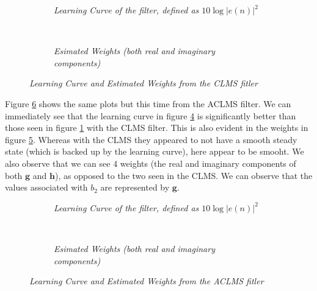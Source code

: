 \documentclass[./main.tex]{subfiles}
\begin{document}
\begin{figure}[h]
	\centering
	\begin{subfigure}[b]{0.49\textwidth}
		\resizebox{\textwidth}{!}{}
		\caption{\textit{Learning Curve of the filter, defined as $ 10 \log|e(n)|^2 $}}
		\label{fig:4_1_a_clms_err}
	\end{subfigure}
	~ %
	\begin{subfigure}[b]{0.49\textwidth}
	 \resizebox{\textwidth}{!}{}
		\caption{\textit{Esimated Weights (both real and imaginary components)}}
		\label{fig:4_1_a_clms_weights}
	\end{subfigure}
	\caption{\textit{Learning Curve and Estimated Weights from the CLMS fitler}}
\end{figure}

Figure \ref{fig:4_1_a_aclms} shows the same plots but this time from the ACLMS filter. We can immediately see that the learning curve in figure \ref{fig:4_1_a_aclms_err} is significantly better than those seen in figure \ref{fig:4_1_a_clms_err} with the CLMS filter. This is also evident in the weights in figure \ref{fig:4_1_a_aclms_weights}. Whereas with the CLMS they appeared to not have a smooth steady state (which is backed up by the learning curve), here appear to be smooht. We also observe that we can see 4 weights (the real and imaginary components of both $ \mathbf{g}$ and $ \mathbf{h}$), as opposed to the two seen in the CLMS. We can observe that the values associated with $ b_2 $ are represented by $ \mathbf{g} $.

\begin{figure}[h]
	\centering
	\begin{subfigure}[b]{0.49\textwidth}
		\resizebox{\textwidth}{!}{}
		\caption{\textit{Learning Curve of the filter, defined as $ 10 \log|e(n)|^2 $}}
		\label{fig:4_1_a_aclms_err}
	\end{subfigure}
	~ %
	\begin{subfigure}[b]{0.49\textwidth}
		\resizebox{\textwidth}{!}{}
		\caption{\textit{Esimated Weights (both real and imaginary components)}}
		\label{fig:4_1_a_aclms_weights}
	\end{subfigure}
	\caption{\textit{Learning Curve and Estimated Weights from the ACLMS fitler}}
	\label{fig:4_1_a_aclms}
\end{figure}
\end{document}
